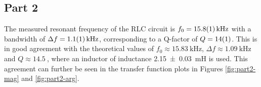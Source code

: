 \documentclass[a4paper]{scrartcl}
\begin{document}
\subsection{Part 2}
The measured resonant frequency of the RLC circuit is \(f_0 = \SI{15.8 \pm 0.1}{\kilo\hertz}\) with a bandwidth of \(\Delta f = \SI{1.1 \pm 0.1}{\kilo\hertz}\), corresponding to a Q-factor of \(Q = \SI{14 \pm 1}{}\). This is in good agreement with the theoretical values of \(f_0 \approx \SI{15.83}{\kilo\hertz}\), \(\Delta f \approx \SI{1.09}{\kilo\hertz}\) and \(Q \approx \SI{14.5}{}\), where an inductor of inductance \SI{2.15 \pm 0.03}{\milli\henry} is used. This agreement can further be seen in the transfer function plots in Figures \ref{fig:part2-mag} and \ref{fig:part2-arg}.
\end{document}
